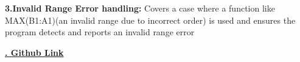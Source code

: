 \documentclass{styles}
\begin{document}
\vspace{6pt} %

\noindent
{\fontsize{14pt}{11pt} \selectfont \textbf{3.Invalid Range Error handling:}}  
{\fontsize{14pt}{11pt} \selectfont Covers a case where a function like MAX(B1:A1)(an invalid range due to incorrect order) is used and ensures the program detects and reports an invalid range error}












\newpage
\href{https://github.com/BEAST-33/COP290_C_lab_conquerers}{{\Large \textbf{. Github Link}}}





\printbibliography
\end{document}
